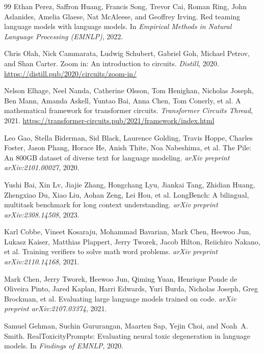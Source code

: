 \documentclass[10pt,twocolumn]{article}
\begin{document}
\begin{thebibliography}{99}
Ethan Perez, Saffron Huang, Francis Song, Trevor Cai, Roman Ring, John Aslanides, Amelia Glaese, Nat McAleese, and Geoffrey Irving.
\newblock Red teaming language models with language models.
\newblock In \emph{Empirical Methods in Natural Language Processing (EMNLP)}, 2022.

Chris Olah, Nick Cammarata, Ludwig Schubert, Gabriel Goh, Michael Petrov, and Shan Carter.
\newblock Zoom in: An introduction to circuits.
\newblock \emph{Distill}, 2020.
\newblock \url{https://distill.pub/2020/circuits/zoom-in/}

Nelson Elhage, Neel Nanda, Catherine Olsson, Tom Henighan, Nicholas Joseph, Ben Mann, Amanda Askell, Yuntao Bai, Anna Chen, Tom Conerly, et al.
\newblock A mathematical framework for transformer circuits.
\newblock \emph{Transformer Circuits Thread}, 2021.
\newblock \url{https://transformer-circuits.pub/2021/framework/index.html}

Leo Gao, Stella Biderman, Sid Black, Laurence Golding, Travis Hoppe, Charles Foster, Jason Phang, Horace He, Anish Thite, Noa Nabeshima, et al.
\newblock The Pile: An 800GB dataset of diverse text for language modeling.
\newblock \emph{arXiv preprint arXiv:2101.00027}, 2020.

Yushi Bai, Xin Lv, Jiajie Zhang, Hongchang Lyu, Jiankai Tang, Zhidian Huang, Zhengxiao Du, Xiao Liu, Aohan Zeng, Lei Hou, et al.
\newblock LongBench: A bilingual, multitask benchmark for long context understanding.
\newblock \emph{arXiv preprint arXiv:2308.14508}, 2023.

Karl Cobbe, Vineet Kosaraju, Mohammad Bavarian, Mark Chen, Heewoo Jun, Lukasz Kaiser, Matthias Plappert, Jerry Tworek, Jacob Hilton, Reiichiro Nakano, et al.
\newblock Training verifiers to solve math word problems.
\newblock \emph{arXiv preprint arXiv:2110.14168}, 2021.

Mark Chen, Jerry Tworek, Heewoo Jun, Qiming Yuan, Henrique Ponde de Oliveira Pinto, Jared Kaplan, Harri Edwards, Yuri Burda, Nicholas Joseph, Greg Brockman, et al.
\newblock Evaluating large language models trained on code.
\newblock \emph{arXiv preprint arXiv:2107.03374}, 2021.

Samuel Gehman, Suchin Gururangan, Maarten Sap, Yejin Choi, and Noah~A. Smith.
\newblock RealToxicityPrompts: Evaluating neural toxic degeneration in language models.
\newblock In \emph{Findings of EMNLP}, 2020.


\end{thebibliography}
\end{document}
